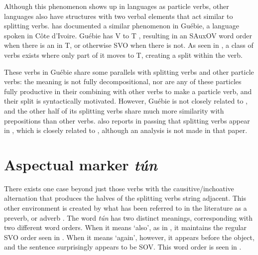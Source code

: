 \documentclass[output=paper,newtxmath,modfonts,nonflat,draftmode]{langsci/langscibook}
\begin{document}
Although this phenomenon shows up in  languages as particle verbs, other languages also have structures with two verbal elements that act similar to  splitting verbs. \cite{Sande2016} has documented a similar phenomenon in Guébie, a  language spoken in C\^{o}te d'Ivoire. Guébie has V to T , resulting in an SAuxOV word order when there is an  in T, or otherwise SVO when there is not. As seen in , a class of verbs exists where only part of it moves to T, creating a split within the verb.


\ea 
        
    
        
    \label{ex:parrish:guebie}
 \z 
\z


These verbs in Guébie share some parallels with  splitting verbs and other particle verbs: the meaning is not fully decompositional, nor are any of these particles fully productive in their combining with other verbs to make a particle verb, and their split is syntactically motivated. However, Guébie is not closely related to , and the other half of its splitting verbs share much more similarity with prepositions than other verbs. \citet{Ogie2009} also reports in passing that splitting verbs appear in , which is closely related to , although an analysis is not made in that paper.


\section{Aspectual marker \textit{tún}}
\label{sect:parrish:TunSection}

There exists one case beyond just those verbs with the causitive/inchoative alternation that produces the halves of the splitting verbs string adjacent. This other environment is created by what has been referred to in the literature as a preverb, or adverb \citep{Bamgbose1966,Bode2007}. The word \textit{tún} has two distinct meanings, corresponding with two different word orders. When it means ‘also’, as in , it maintains the regular SVO order seen in . When it means ‘again’, however, it appears before the object, and the sentence surprisingly appears to be SOV. This word order is seen in .
\end{document}
